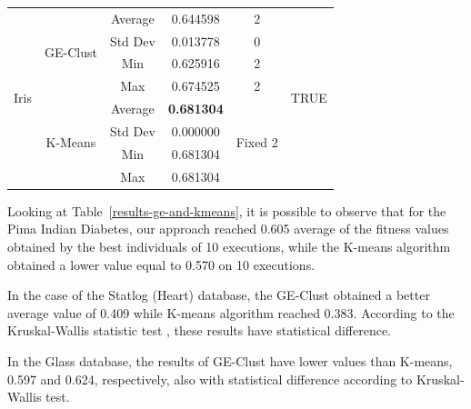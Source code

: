 \documentclass[conference,compsoc]{IEEEtran}
\begin{document}
\begin{table}[]
\begin{tabular}{|c|c|c|c|c|c|}
		\multirow{8}{*}{Iris}                  & \multirow{4}{*}{GE-Clust}           & Average                        & 0.644598                   & 2                        & \multirow{8}{*}{TRUE} \\ \cline{3-5}
		&                               & Std Dev                        & 0.013778                   & 0                        &                       \\ \cline{3-5}
		&                               & Min                            & 0.625916                   & 2                        &                       \\ \cline{3-5}
		&                               & Max                            & 0.674525                   & 2                        &                       \\ \cline{2-5}
		& \multirow{4}{*}{K-Means}      & Average                        & \textbf{0.681304}                   & \multirow{4}{*}{Fixed 2} &                       \\ \cline{3-4}
		&                               & Std Dev                        & 0.000000                   &                          &                       \\ \cline{3-4}
		&                               & Min                            & 0.681304                   &                          &                       \\ \cline{3-4}
		&                               & Max                            & 0.681304                   &                          &                       \\ \cline{3-4}							\hline
	\end{tabular}
\end{table}



Looking at Table~\ref{results-ge-and-kmeans}, it is possible to observe that for the Pima Indian Diabetes, our approach reached 0.605 average of the fitness values obtained by the best individuals of 10 executions, while the K-means algorithm obtained a lower value equal to 0.570 on 10 executions.


In the case of the Statlog (Heart) database,  the GE-Clust obtained a better average value of 0.409 while K-means algorithm reached 0.383. According to the  Kruskal-Wallis statistic test \cite{mckight2010kruskal}, these results have statistical difference.


In the Glass database, the results of GE-Clust have lower values than K-means, 0.597 and 0.624, respectively, also with statistical difference according to Kruskal- Wallis test. 
\end{document}
